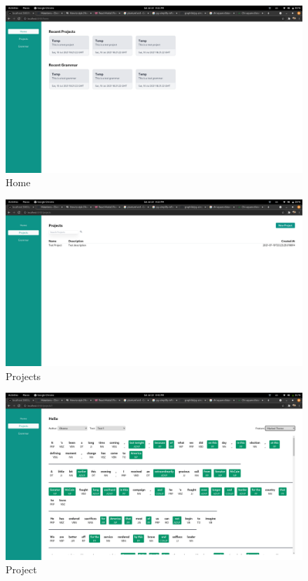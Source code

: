 \begin{figure}[H]
    \includegraphics[width=15cm]{images/Home.png}
    \caption{Home}
\end{figure}

\begin{figure}[H]
    \includegraphics[width=15cm]{images/Projects.png}
    \caption{Projects}
\end{figure}
\begin{figure}[H]
    \includegraphics[width=15cm]{images/Project.png}
    \caption{Project}
\end{figure}

